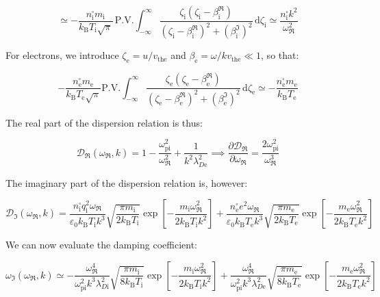 \begin{equation}
    \simeq-\frac{n_\mathrm{i}^\square m_\mathrm{i}}{k_\mathrm{B}T_\mathrm{i}\sqrt{\pi}}\,\text{P.V.}\int_{-\infty}^\infty\frac{\zeta_\mathrm{i}(\zeta_\mathrm{i}-\beta_\mathrm{i}^\Re)}{(\zeta_\mathrm{i}-\beta_\mathrm{i}^\Re)^2+(\beta_\mathrm{i}^\Im)^2}\,\mathrm{d}\zeta_\mathrm{i}\simeq\frac{n_\mathrm{i}^\square k^2}{\omega_\Re^2}
\end{equation}

For electrons, we introduce $\zeta_\text{e}=u/v_\text{the}$ and $\beta_\text{e}=\omega/kv_\text{the}\ll1$, so that:

\begin{equation}
    -\frac{n_\text{e}^\square m_\text{e}}{k_\mathrm{B}T_\text{e}\sqrt{\pi}}\text{P.V.}\int_{-\infty}^\infty\frac{\zeta_\text{e}(\zeta_\text{e}-\beta_\text{e}^\Re)}{(\zeta_\text{e}-\beta_\text{e}^\Re)^2+(\beta_\text{e}^\Im)^2}\,\mathrm{d}\zeta_\text{e}\simeq-\frac{n_\text{e}^\square m_\text{e}}{k_\mathrm{B}T_\text{e}}
\end{equation}

The real part of the dispersion relation is thus:

\begin{equation}
    \mathcal{D}_\Re(\omega_\Re,k)=1-\frac{\omega_\text{pi}^2}{\omega_\Re^2}+\frac{1}{k^2\lambda_{D\text{e}}^2}\implies\frac{\partial \mathcal{D}_\Re}{\partial\omega_\Re}=\frac{2\omega_\text{pi}^2}{\omega_\Re^3}
\end{equation}

The imaginary part of the dispersion relation is, however:

\begin{equation}
    \mathcal{D}_\Im(\omega_\Re,k)=\frac{n_\mathrm{i}^\square q_\mathrm{i}^2\omega_\Re}{\varepsilon_0k_\mathrm{B}T_\mathrm{i}k^3}\sqrt{\frac{\pi m_\mathrm{i}}{2k_\mathrm{B}T_\mathrm{i}}}\exp{\left[-\frac{m_\mathrm{i}\omega_\Re^2}{2k_\mathrm{B}T_\mathrm{i}k^2}\right]}+\frac{n_\text{e}^\square e^2\omega_\Re}{\varepsilon_0k_\mathrm{B}T_\text{e}k^3}\sqrt{\frac{\pi m_\text{e}}{2k_\mathrm{B}T_\text{e}}}\exp{\left[-\frac{m_\text{e}\omega_\Re^2}{2k_\mathrm{B}T_\text{e}k^2}\right]}
\end{equation}

We can now evaluate the damping coefficient:

\begin{equation}
    \omega_\Im(\omega_\Re,k)\simeq-\frac{\omega_\Re^4}{\omega_\text{pi}^2k^3\lambda_{D\mathrm{i}}^2}\sqrt{\frac{\pi m_\mathrm{i}}{8k_\mathrm{B}T_\mathrm{i}}}\exp{\left[-\frac{m_\mathrm{i}\omega_\Re^2}{2k_\mathrm{B}T_\mathrm{i}k^2}\right]}+\frac{\omega_\Re^4}{\omega_\text{pi}^2k^3\lambda_{D\text{e}}^2}\sqrt{\frac{\pi m_\text{e}}{8k_\mathrm{B}T_\text{e}}}\exp{\left[-\frac{m_\text{e}\omega_\Re^2}{2k_\mathrm{B}T_\text{e}k^2}\right]}
\end{equation}

